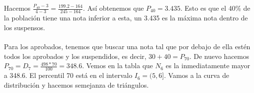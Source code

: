     \begin{center}
    \end{center} 
    Hacemos $\frac{P_{40}-3}{4-3}=\frac{199.2-164}{245-164}$. Así obtenemos que $P_{40} = 3.435$. Esto es que el 40\% de la población tiene una nota inferior a esta, un 3.435 es la máxima nota dentro de los suspensos. \\ \\
    Para los aprobados, tenemos que buscar una nota tal que por debajo de ella estén todos los aprobados y los suspendidos, es decir, $30+40 = P_{70}$. De nuevo hacemos $P_{70}=D_{7}=\frac{498*70}{100}=348.6$. Vemos en la tabla que $N_{6}$ es la inmediatamente mayor a 348.6. El percentil 70 está en el intervalo $I_6 = (5,6]$. Vamos a la curva de distribución y hacemos semejanza de triángulos. \\
    
